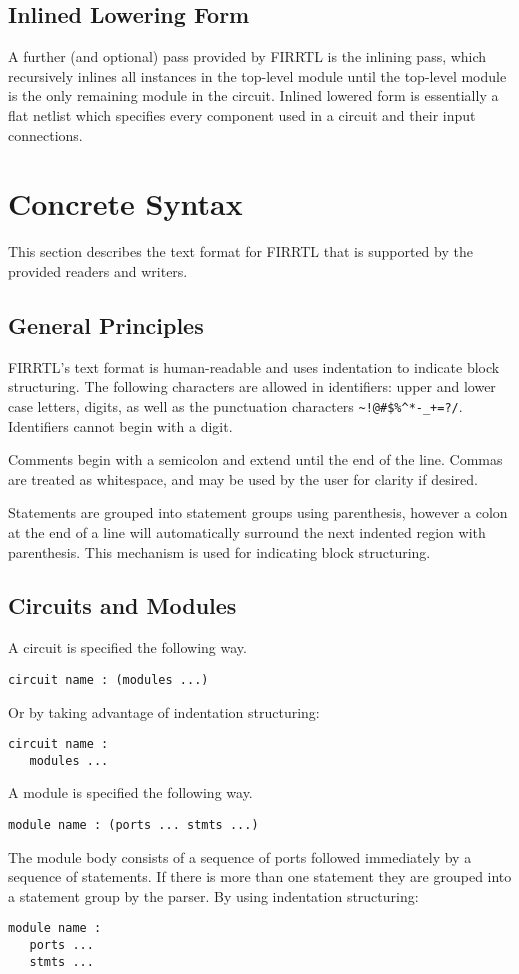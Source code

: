 \documentclass[10pt]{article}
\begin{document}
\subsection{Inlined Lowering Form}
A further (and optional) pass provided by FIRRTL is the inlining pass, which recursively inlines all instances in the top-level module until the top-level module is the only remaining module in the circuit.
Inlined lowered form is essentially a flat netlist which specifies every component used in a circuit and their input connections. 

\section{Concrete Syntax}\label{concrete}
This section describes the text format for FIRRTL that is supported by the provided readers and writers.

\subsection*{General Principles}
FIRRTL's text format is human-readable and uses indentation to indicate block structuring.
The following characters are allowed in identifiers: upper and lower case letters, digits, as well as the punctuation characters \verb|~!@#$%^*-_+=?/|.
Identifiers cannot begin with a digit. 

Comments begin with a semicolon and extend until the end of the line.
Commas are treated as whitespace, and may be used by the user for clarity if desired. 

Statements are grouped into statement groups using parenthesis, however a colon at the end of a line will automatically surround the next indented region with parenthesis.
This mechanism is used for indicating block structuring. 

\subsection*{Circuits and Modules}
A circuit is specified the following way.
\begin{verbatim}
circuit name : (modules ...)
\end{verbatim}
Or by taking advantage of indentation structuring:
\begin{verbatim}
circuit name :
   modules ...
\end{verbatim}

A module is specified the following way.
\begin{verbatim}
module name : (ports ... stmts ...)
\end{verbatim}
The module body consists of a sequence of ports followed immediately by a sequence of statements.
If there is more than one statement they are grouped into a statement group by the parser. 
By using indentation structuring:
\begin{verbatim}
module name :
   ports ...
   stmts ...
\end{verbatim}
\end{document}

